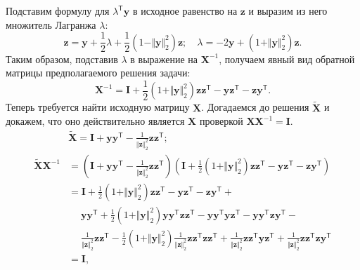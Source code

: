 \documentclass[a4paper,12pt]{article}
\renewcommand{\top}{\mathsf{T}}
\begin{document}
\begin{enumerate}
$$	$$
	Подставим формулу для $\lambda^\top \mathbf{y}$ в исходное равенство на $\mathbf{z}$ и выразим из него множитель Лагранжа $\lambda$:
	$$
	\mathbf{z} = \mathbf{y} + \frac{1}{2}\lambda + \frac{1}{2}(1 - \Vert \mathbf{y} \Vert_2^2) \mathbf{z};\quad \lambda = -2\mathbf{y} + (1 + \Vert \mathbf{y} \Vert_2^2) \mathbf{z}.
	$$ 
	Таким образом, подставив $\lambda$ в выражение на $\mathbf{X}^{-1}$, получаем явный вид обратной матрицы предполагаемого решения задачи:
	$$
	\mathbf{X}^{-1} = \mathbf{I} + \frac{1}{2}\left(  1 +  \Vert \mathbf{y} \Vert_2^2\right) \mathbf{z}\mathbf{z}^\top - \mathbf{y}\mathbf{z}^\top - \mathbf{z}\mathbf{y}^\top.
	$$
	Теперь требуется найти исходную матрицу $\mathbf{X}$. Догадаемся до решения $\tilde{\mathbf{X}}$ и докажем, что оно действительно является $\mathbf{X}$ проверкой $\mathbf{X} \mathbf{X}^{-1} = \mathbf{I}$.
	\begin{equation*}\begin{aligned}
	&\tilde{\mathbf{X}} = \mathbf{I} + \mathbf{y} \mathbf{y}^\top - \frac{1}{\Vert\mathbf{z}\Vert_2^2} \mathbf{z} \mathbf{z}^\top; \\
	\tilde{\mathbf{X}} \mathbf{X}^{-1} &= \left(\mathbf{I} + \mathbf{y} \mathbf{y}^\top - \frac{1}{\Vert\mathbf{z}\Vert_2^2} \mathbf{z} \mathbf{z}^\top\right) 
	\left(\mathbf{I} + \frac{1}{2}\left(  1 +  \Vert \mathbf{y} \Vert_2^2\right) \mathbf{z}\mathbf{z}^\top - \mathbf{y}\mathbf{z}^\top - \mathbf{z}\mathbf{y}^\top\right) \\
	&=\mathbf{I} + \frac{1}{2}\left(  1 +  \Vert \mathbf{y} \Vert_2^2\right) \mathbf{z}\mathbf{z}^\top - \mathbf{y}\mathbf{z}^\top - \mathbf{z}\mathbf{y}^\top + \\
	 &\quad\;\mathbf{y} \mathbf{y}^\top + \frac{1}{2}\left(  1 +  \Vert \mathbf{y} \Vert_2^2\right) \mathbf{y} \mathbf{y}^\top \mathbf{z}\mathbf{z}^\top - \mathbf{y} \mathbf{y}^\top\mathbf{y}\mathbf{z}^\top - \mathbf{y} \mathbf{y}^\top\mathbf{z}\mathbf{y}^\top - \\
	 &\quad\;\frac{1}{\Vert\mathbf{z}\Vert_2^2} \mathbf{z} \mathbf{z}^\top - \frac{1}{2}\left(  1 +  \Vert \mathbf{y} \Vert_2^2\right) \frac{1}{\Vert\mathbf{z}\Vert_2^2} \mathbf{z} \mathbf{z}^\top \mathbf{z}\mathbf{z}^\top + \frac{1}{\Vert\mathbf{z}\Vert_2^2} \mathbf{z} \mathbf{z}^\top \mathbf{y}\mathbf{z}^\top + \frac{1}{\Vert\mathbf{z}\Vert_2^2} \mathbf{z} \mathbf{z}^\top \mathbf{z}\mathbf{y}^\top \\
	 &=\mathbf{I},
	\end{aligned}\end{equation*}

\end{enumerate}
\end{document}
